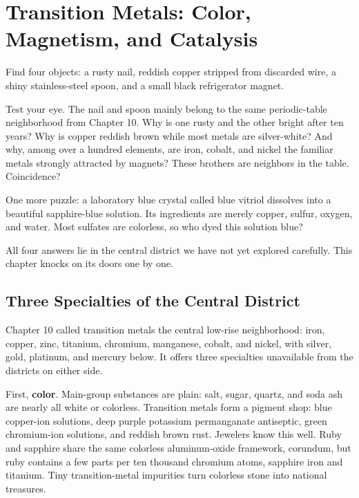 \chapter{Transition Metals: Color, Magnetism, and Catalysis}

\begin{kaichang}
Find four objects: a rusty nail, reddish copper stripped from discarded wire, a shiny stainless-steel spoon, and a small black refrigerator magnet.

Test your eye. The nail and spoon mainly belong to the same periodic-table neighborhood from Chapter 10. Why is one rusty and the other bright after ten years? Why is copper reddish brown while most metals are silver-white? And why, among over a hundred elements, are iron, cobalt, and nickel the familiar metals strongly attracted by magnets? These brothers are neighbors in the table. Coincidence?

One more puzzle: a laboratory blue crystal called blue vitriol dissolves into a beautiful sapphire-blue solution. Its ingredients are merely copper, sulfur, oxygen, and water. Most sulfates are colorless, so who dyed this solution blue?

All four answers lie in the central district we have not yet explored carefully. This chapter knocks on its doors one by one.
\end{kaichang}

\section{Three Specialties of the Central District}

Chapter 10 called transition metals the central low-rise neighborhood: iron, copper, zinc, titanium, chromium, manganese, cobalt, and nickel, with silver, gold, platinum, and mercury below. It offers three specialties unavailable from the districts on either side.

First, \textbf{color}. Main-group substances are plain: salt, sugar, quartz, and soda ash are nearly all white or colorless. Transition metals form a pigment shop: blue copper-ion solutions, deep purple potassium permanganate antiseptic, green chromium-ion solutions, and reddish brown rust. Jewelers know this well. Ruby and sapphire share the same colorless aluminum-oxide framework, corundum, but ruby contains a few parts per ten thousand chromium atoms, sapphire iron and titanium. Tiny transition-metal impurities turn colorless stone into national treasures.

